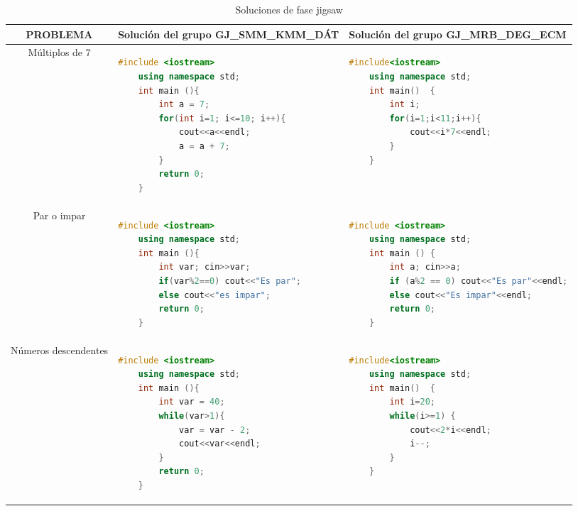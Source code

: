 \begin{landscape}

\begin{longtable}{cL{8cm}L{9cm}}
	\caption{Soluciones de fase jigsaw}
	\label{tab:c6_soluciones_fase_jigsaw}\\
	\toprule
	PROBLEMA & Solución del grupo GJ\_SMM\_KMM\_DÁT & Solución del grupo GJ\_MRB\_DEG\_ECM\\
	\midrule
	Múltiplos de 7 & 
	\begin{lstlisting}[language = C++, basicstyle=\footnotesize] 
	#include <iostream>
	using namespace std;
	int main (){
		int a = 7;
		for(int i=1; i<=10; i++){
			cout<<a<<endl;
			a = a + 7;
		}
		return 0;
	}		
	\end{lstlisting}&
	\begin{lstlisting}[language = C++, basicstyle=\footnotesize] 
	#include<iostream>
	using namespace std;
	int main()	{
		int i;	
		for(i=1;i<11;i++){
			cout<<i*7<<endl;
		}
	}		
	\end{lstlisting}\\
	Par o impar &
	\begin{lstlisting}[language = C++, basicstyle=\footnotesize] 
	#include <iostream>
	using namespace std;
	int main (){
		int var; cin>>var;
		if(var%2==0) cout<<"Es par";
		else cout<<"es impar";
		return 0;
	}	
	\end{lstlisting}&
	\begin{lstlisting}[language = C++, basicstyle=\footnotesize] 
	#include <iostream>
	using namespace std;
	int main () {
		int a; cin>>a;
		if (a%2 == 0) cout<<"Es par"<<endl;
		else cout<<"Es impar"<<endl;
		return 0;
	}	
	\end{lstlisting}\\
	Números descendentes & 
	\begin{lstlisting}[language = C++, basicstyle=\footnotesize] 
	#include <iostream>
	using namespace std;
	int main (){
		int var = 40;
		while(var>1){
			var = var - 2;
			cout<<var<<endl;
		}
		return 0;
	}
	\end{lstlisting}&
	\begin{lstlisting}[language = C++, basicstyle=\footnotesize] 
	#include<iostream>
	using namespace std;
	int main()	{
		int i=20;
		while(i>=1)	{
			cout<<2*i<<endl;
			i--;
		}
	}
	\end{lstlisting}\\
\end{longtable}
\end{landscape}
